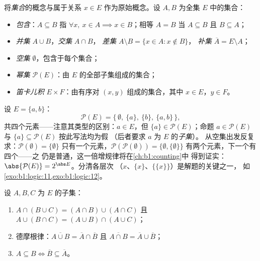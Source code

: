 \begin{definition}[集合的运算]\label{def:b1:logic:sets}
将\emph{集合}的概念与属于关系
$x \in E$ 作为原始概念。设 $A, B$ 为全集 $E$ 中的集合：
\begin{itemize}
  \item \emph{包含}：$A \subseteq B$ 指 $\forall x,\ x \in A
        \implies x \in B$；相等 $A = B$ 当 $A \subseteq B$ 且
        $B \subseteq A$；
  \item \emph{并集} $A \cup B$，\emph{交集} $A \cap B$，
        \emph{差集} $A \setminus B = \{x \in A : x \notin B\}$，
        \emph{补集} $\overline{A} = E \setminus A$；
  \item \emph{空集} $\emptyset$，包含于每个集合；
  \item \emph{幂集} $\mathcal{P}(E)$：由
        $E$ 的全部子集组成的集合；
  \item \emph{笛卡儿积} $E \times F$：由有序对
        $(x, y)$ 组成的集合，其中 $x \in E$，$y \in F$。
\end{itemize}
\end{definition}

\begin{example}[熟悉幂集]\label{ex:b1:logic:powerset}
设 $E = \{a, b\}$：
\[
\mathcal P(E) = \bigl\{\, \emptyset,\ \{a\},\ \{b\},\ \{a, b\}
\,\bigr\},
\]
共四个元素——注意其类型的区别：$a \in E$，但
$\{a\} \in \mathcal P(E)$；命题 $a \in \mathcal P(E)$
与 $\{a\} \subseteq \mathcal P(E)$ 按此写法均为假
（后者要求 $a$ 为 $E$ 的\emph{子集}）。
从空集出发反复求：$\mathcal P(\emptyset) = \{\emptyset\}$
只有一个元素，$\mathcal P(\mathcal P(\emptyset)) = \{\emptyset,
\{\emptyset\}\}$ 有两个元素，下一个有四个——之
仍是普通，这一倍增规律将在\cref{ch:b1:counting}中
得到证实：$\abs{\mathcal P(E)} = 2^{\abs E}$。分清各层次
（$x$、$\{x\}$、$\{\{x\}\}$）是解题的关键之一，
如\cref{exo:b1:logic:11,exo:b1:logic:12}。
\end{example}

\begin{proposition}[集合代数]\label{prop:b1:logic:setalgebra}
设 $A, B, C$ 为 $E$ 的子集：
\begin{enumerate}
  \item $A \cap (B \cup C) = (A \cap B) \cup (A \cap C)$ 且
        $A \cup (B \cap C) = (A \cup B) \cap (A \cup C)$；
  \item 德摩根律：$\overline{A \cup B} = \overline{A} \cap
        \overline{B}$ 且 $\overline{A \cap B} = \overline{A} \cup
        \overline{B}$；
  \item $A \subseteq B \iff \overline{B} \subseteq \overline{A}$。
\end{enumerate}
\end{proposition}


